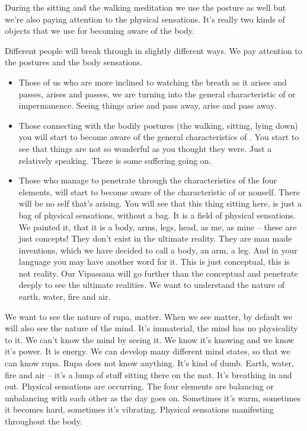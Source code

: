 \documentclass[letterpaper,10pt,english]{sphinxmanual}
\begin{document}
\sphinxAtStartPar
During  the  sitting  and  the  walking  meditation  we  use  the  posture  as
well but we’re also paying attention to the physical sensations. It’s really two
kinds of objects that we use for becoming aware of the body.

\sphinxAtStartPar
Different people will break through in slightly different ways. We pay
attention to the postures and the body sensations.
\begin{itemize}
\item {} 
\sphinxAtStartPar
{} Those of us who are more inclined to watching the breath as it arises
and passes, arises and passes, we are turning into the general characteristic of
or impermanence. Seeing things arise and pass away,
arise and pass away.

\item {} 
\sphinxAtStartPar
Those connecting with the bodily postures (the walking, sitting, lying
down) you will start to become aware of the general characteristics of
. You start to see that things are not so wonderful as you thought
they were. Just a relatively speaking. There is some suffering going on.

\item {} 
\sphinxAtStartPar
Those who manage to penetrate through the characteristics of the four
elements, will start to become aware of the characteristic of
or
non\sphinxhyphen{}self. There will be no self that’s arising. You will see that this thing
sitting  here,  is  just  a  bag  of  physical  sensations,  without  a  bag.  It  is
a  field  of  physical  sensations.  We  painted  it,  that  it  is  a  body,  arms,
legs, head, as me, as mine – these are just concepts! They don’t exist
in the ultimate reality. They are man made inventions, which we have
decided to call a body, an arm, a leg. And in your language you may
have another word for it. This is just conceptual, this is not reality. Our
Vipassana will go further than the conceptual and penetrate deeply to
see the ultimate realities. We want to understand the nature of earth,
water, fire and air.

\end{itemize}

\sphinxAtStartPar
We  want  to  see  the  nature  of  rupa,  matter.  When  we  see  matter,  by
default  we  will  also  see  the  nature  of  the  mind.  It’s  immaterial,  the  mind
has no physicality to it. We can’t know the mind by seeing it. We know it’s
knowing and we know it’s power. It is energy. We can develop many different mind states, so that we can know rupa. Rupa does not know anything. It’s
kind of dumb. Earth, water, fire and air – it’s a lump of stuff sitting there on
the mat. It’s breathing in and out. Physical sensations are occurring. The four
elements are balancing or unbalancing with each other as the day goes on.
Sometimes it’s warm, sometimes it becomes hard, sometimes it’s vibrating.
Physical sensations manifesting throughout the body.
\end{document}
